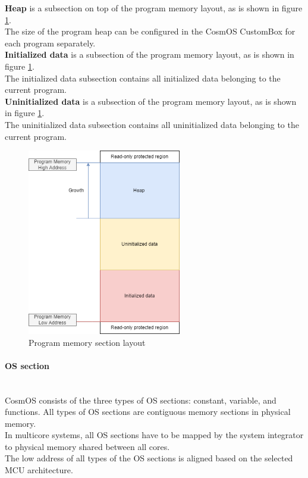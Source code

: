 \textbf{Heap} is a subsection on top of the program memory layout, as is shown in figure \ref{fig:ProgramMapping}.\\
\indent The size of the program heap can be configured in the CosmOS CustomBox for each program separately.\\

\textbf{Initialized data} is a subsection of the program memory layout, as is shown in figure \ref{fig:ProgramMapping}.\\
\indent The initialized data subsection contains all initialized data belonging to the current program.\\

\textbf{Uninitialized data} is a subsection of the program memory layout, as is shown in figure \ref{fig:ProgramMapping}.\\
\indent The uninitialized data subsection contains all uninitialized data belonging to the current program.

\begin{figure}[H]
\begin{center}
\includegraphics[width=0.6\textwidth]{images/program_mapping.png}
\caption{Program memory section layout}
\label{fig:ProgramMapping}
\end{center}
\end{figure}

\paragraph{OS section}\label{osSections}\mbox{}\\
\indent CosmOS consists of the three types of \ac{OS} sections: constant, variable, and functions. All types of \ac{OS} sections are contiguous memory sections in physical memory.\\
\indent In multicore systems, all \ac{OS} sections have to be mapped by the system integrator to physical memory shared between all cores.\\
\indent The low address of all types of the \ac{OS} sections is aligned based on the selected \ac{MCU} architecture. \\

